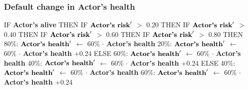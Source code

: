 \documentclass{article}%
\begin{document}
\subsubsection{Default change in Actor's health}%
\label{ssubsec:Default change in Actor's health}%
\begin{flushleft}%
IF %
\textbf{Actor's alive}%
\linebreak%
\hspace*{2em}%
THEN %
IF %
$\mbox{\textbf{Actor's risk}} '$%
$>$%
0.20%
\linebreak%
\hspace*{4em}%
THEN %
IF %
$\mbox{\textbf{Actor's risk}} '$%
$>$%
0.40%
\linebreak%
\hspace*{6em}%
THEN %
IF %
$\mbox{\textbf{Actor's risk}} '$%
$>$%
0.60%
\linebreak%
\hspace*{8em}%
THEN %
IF %
$\mbox{\textbf{Actor's risk}} '$%
$>$%
0.80%
\linebreak%
\hspace*{10em}%
THEN %
\linebreak%
\hspace*{12em}%
80\%: %
$\mbox{\textbf{Actor's health}} '$%
$\leftarrow$%
60\%%
$\cdot$%
\textbf{Actor's health}%
\linebreak%
\hspace*{12em}%
20\%: %
$\mbox{\textbf{Actor's health}} '$%
$\leftarrow$%
60\%%
$\cdot$%
\textbf{Actor's health}%
+0.24%
\linebreak%
\hspace*{10em}%
ELSE %
\linebreak%
\hspace*{12em}%
60\%: %
$\mbox{\textbf{Actor's health}} '$%
$\leftarrow$%
60\%%
$\cdot$%
\textbf{Actor's health}%
\linebreak%
\hspace*{12em}%
40\%: %
$\mbox{\textbf{Actor's health}} '$%
$\leftarrow$%
60\%%
$\cdot$%
\textbf{Actor's health}%
+0.24%
\linebreak%
\hspace*{8em}%
ELSE %
\linebreak%
\hspace*{10em}%
40\%: %
$\mbox{\textbf{Actor's health}} '$%
$\leftarrow$%
60\%%
$\cdot$%
\textbf{Actor's health}%
\linebreak%
\hspace*{10em}%
60\%: %
$\mbox{\textbf{Actor's health}} '$%
$\leftarrow$%
60\%%
$\cdot$%
\textbf{Actor's health}%
+0.24%

\end{flushleft}
\end{document}
